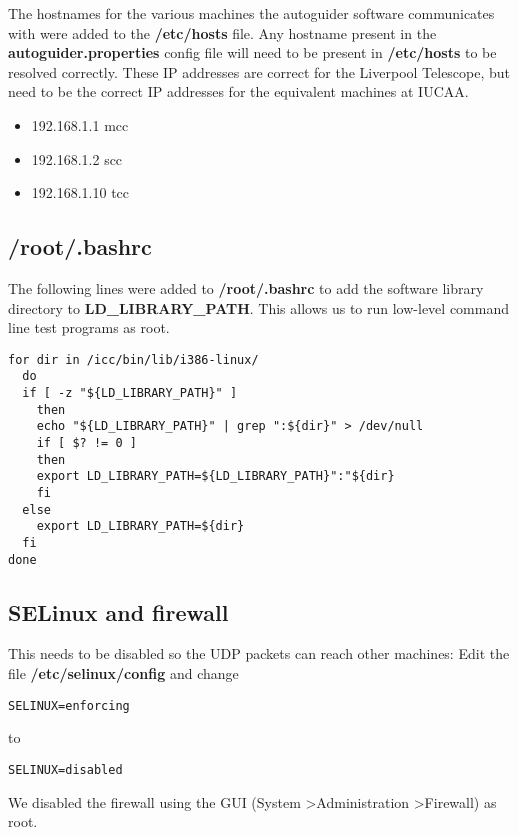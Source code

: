 \documentclass[10pt,a4paper]{article}
\begin{document}
The hostnames for the various machines the autoguider software communicates with were added to the {\bf /etc/hosts} file. Any hostname present in the {\bf autoguider.properties} config file will need to be present in {\bf /etc/hosts} to be resolved correctly. These IP addresses are correct for the Liverpool Telescope, but need to be the correct IP addresses for the equivalent machines at IUCAA.

\begin{itemize}
\item 192.168.1.1     mcc
\item 192.168.1.2     scc
\item 192.168.1.10    tcc
\end{itemize}

\subsection{/root/.bashrc}

The following lines were added to {\bf /root/.bashrc} to add the software library directory to
{\bf LD\_LIBRARY\_PATH}. This allows us to run low-level command line test programs as root.

\begin{verbatim}
for dir in /icc/bin/lib/i386-linux/ 
  do
  if [ -z "${LD_LIBRARY_PATH}" ] 
    then
    echo "${LD_LIBRARY_PATH}" | grep ":${dir}" > /dev/null
    if [ $? != 0 ] 
    then
	export LD_LIBRARY_PATH=${LD_LIBRARY_PATH}":"${dir}
    fi
  else
    export LD_LIBRARY_PATH=${dir}
  fi
done
\end{verbatim}

\subsection{SELinux and firewall}

This needs to be disabled so the UDP packets can reach other machines:
Edit the file {\bf /etc/selinux/config} and change

\begin{verbatim}
SELINUX=enforcing
\end{verbatim}

to

\begin{verbatim}
SELINUX=disabled
\end{verbatim}

We disabled the firewall using the GUI (System \textgreater Administration \textgreater Firewall) as root.
\end{document}
